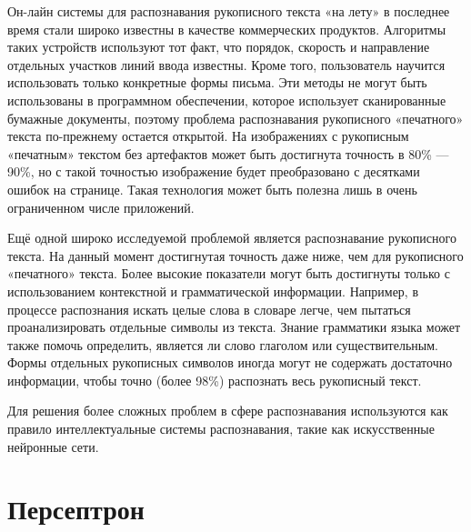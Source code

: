 Он-лайн системы для распознавания рукописного текста «на лету» в последнее время стали широко известны в качестве коммерческих продуктов. Алгоритмы таких устройств используют тот факт, что порядок, скорость и направление отдельных участков линий ввода известны. Кроме того, пользователь научится использовать только конкретные формы письма. Эти методы не могут быть использованы в программном обеспечении, которое использует сканированные бумажные документы, поэтому проблема распознавания рукописного «печатного» текста по-прежнему остается открытой. На изображениях с рукописным «печатным» текстом без артефактов может быть достигнута точность в 80\% — 90\%, но с такой точностью изображение будет преобразовано с десятками ошибок на странице. Такая технология может быть полезна лишь в очень ограниченном числе приложений.

Ещё одной широко исследуемой проблемой является распознавание рукописного текста. На данный момент достигнутая точность даже ниже, чем для рукописного «печатного» текста. Более высокие показатели могут быть достигнуты только с использованием контекстной и грамматической информации. Например, в процессе распознания искать целые слова в словаре легче, чем пытаться проанализировать отдельные символы из текста. Знание грамматики языка может также помочь определить, является ли слово глаголом или существительным. Формы отдельных рукописных символов иногда могут не содержать достаточно информации, чтобы точно (более 98\%) распознать весь рукописный текст.

Для решения более сложных проблем в сфере распознавания используются как правило интеллектуальные системы распознавания, такие как искусственные нейронные сети.

\section{Персептрон}

